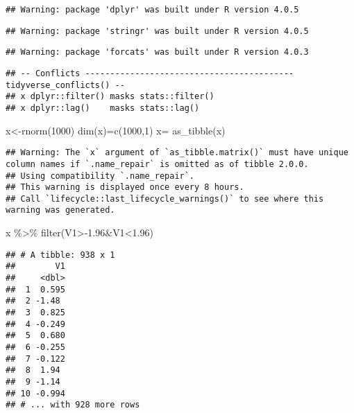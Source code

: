 \documentclass[
]{article}
\newenvironment{Shaded}{\begin{snugshade}}{\end{snugshade}}
\newcommand{\DecValTok}[1]{\textcolor[rgb]{0.00,0.00,0.81}{#1}}
\newcommand{\FloatTok}[1]{\textcolor[rgb]{0.00,0.00,0.81}{#1}}
\newcommand{\FunctionTok}[1]{\textcolor[rgb]{0.00,0.00,0.00}{#1}}
\newcommand{\NormalTok}[1]{#1}
\newcommand{\OtherTok}[1]{\textcolor[rgb]{0.56,0.35,0.01}{#1}}
\newcommand{\SpecialCharTok}[1]{\textcolor[rgb]{0.00,0.00,0.00}{#1}}
\begin{document}
\begin{verbatim}
## Warning: package 'dplyr' was built under R version 4.0.5
\end{verbatim}

\begin{verbatim}
## Warning: package 'stringr' was built under R version 4.0.5
\end{verbatim}

\begin{verbatim}
## Warning: package 'forcats' was built under R version 4.0.3
\end{verbatim}

\begin{verbatim}
## -- Conflicts ------------------------------------------ tidyverse_conflicts() --
## x dplyr::filter() masks stats::filter()
## x dplyr::lag()    masks stats::lag()
\end{verbatim}

\begin{Shaded}
\begin{Highlighting}[]
\NormalTok{x}\OtherTok{\textless{}{-}}\FunctionTok{rnorm}\NormalTok{(}\DecValTok{1000}\NormalTok{)}
\FunctionTok{dim}\NormalTok{(x)}\OtherTok{=}\FunctionTok{c}\NormalTok{(}\DecValTok{1000}\NormalTok{,}\DecValTok{1}\NormalTok{)}
\NormalTok{x}\OtherTok{=} \FunctionTok{as\_tibble}\NormalTok{(x)}
\end{Highlighting}
\end{Shaded}

\begin{verbatim}
## Warning: The `x` argument of `as_tibble.matrix()` must have unique column names if `.name_repair` is omitted as of tibble 2.0.0.
## Using compatibility `.name_repair`.
## This warning is displayed once every 8 hours.
## Call `lifecycle::last_lifecycle_warnings()` to see where this warning was generated.
\end{verbatim}

\begin{Shaded}
\begin{Highlighting}[]
\NormalTok{x }\SpecialCharTok{\%\textgreater{}\%} \FunctionTok{filter}\NormalTok{(V1}\SpecialCharTok{\textgreater{}{-}}\FloatTok{1.96}\SpecialCharTok{\&}\NormalTok{V1}\SpecialCharTok{\textless{}}\FloatTok{1.96}\NormalTok{)}
\end{Highlighting}
\end{Shaded}

\begin{verbatim}
## # A tibble: 938 x 1
##        V1
##     <dbl>
##  1  0.595
##  2 -1.48 
##  3  0.825
##  4 -0.249
##  5  0.680
##  6 -0.255
##  7 -0.122
##  8  1.94 
##  9 -1.14 
## 10 -0.994
## # ... with 928 more rows
\end{verbatim}
\end{document}
